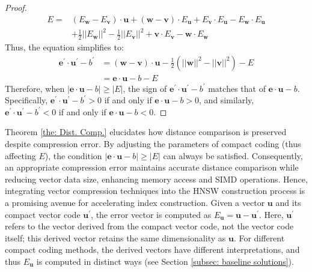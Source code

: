 \begin{proof}
\begin{equation}
\begin{aligned}
    E = &(E_{\boldsymbol{w}}-E_{\boldsymbol{v}}) \cdot \boldsymbol{u} + (\boldsymbol{w}-\boldsymbol{v})\cdot E_{\boldsymbol{u}} + E_{\boldsymbol{v}} \cdot E_{\boldsymbol{u}} - E_{\boldsymbol{w}}\cdot E_{\boldsymbol{u}}\\
    &+ \frac{1}{2}||E_{\boldsymbol{w}}||^2-\frac{1}{2}||E_{\boldsymbol{v}}||^2 +\boldsymbol{v}\cdot E_{\boldsymbol{v}}-\boldsymbol{w}\cdot E_{\boldsymbol{w}}
\end{aligned}
\end{equation}
Thus, the equation simplifies to:
\begin{equation}
\label{equ: error2}
\begin{aligned}
    \boldsymbol{e}^{\prime} \cdot \boldsymbol{u}^{\prime} - b^{\prime}
    &= (\boldsymbol{w}-\boldsymbol{v}) \cdot \boldsymbol{u} -\frac{1}{2} (||\boldsymbol{w}||^2-||\boldsymbol{v}||^2) - E \\
    &=\boldsymbol{e}\cdot \boldsymbol{u}-b - E
\end{aligned}
\end{equation}
Therefore, when $|\boldsymbol{e} \cdot \boldsymbol{u} - b|\geq |E|$, the sign of $\boldsymbol{e}^{\prime} \cdot \boldsymbol{u}^{\prime} - b^{\prime}$ matches that of $\boldsymbol{e} \cdot \boldsymbol{u}-b$. Specifically, $\boldsymbol{e}^{\prime} \cdot \boldsymbol{u}^{\prime} - b^{\prime}>0$ if and only if $\boldsymbol{e} \cdot \boldsymbol{u}-b>0$, and similarly, $\boldsymbol{e}^{\prime} \cdot \boldsymbol{u}^{\prime} - b^{\prime}<0$ if and only if $\boldsymbol{e} \cdot \boldsymbol{u}-b<0$.
\end{proof}

Theorem \ref{the: Dist. Comp.} elucidates how distance comparison is preserved despite compression error. By adjusting the parameters of compact coding (thus affecting $E$), the condition $|\boldsymbol{e} \cdot \boldsymbol{u} - b|\geq |E|$ can always be satisfied. Consequently, an appropriate compression error maintains accurate distance comparison while reducing vector data size, enhancing memory access and SIMD operations. Hence, integrating vector compression techniques into the HNSW construction process is a promising avenue for accelerating index construction.
{
Given a vector $\boldsymbol{u}$ and its compact vector code $\boldsymbol{u}^{\prime}$, the error vector is computed as $E_{\boldsymbol{u}} = \boldsymbol{u} - \boldsymbol{u}^{\prime}$. Here, $\boldsymbol{u}^{\prime}$ refers to the vector derived from the compact vector code, not the vector code itself; this derived vector retains the same dimensionality as $\boldsymbol{u}$.
For different compact coding methods, the derived vectors have different interpretations, and thus $E_{\boldsymbol{u}}$ is computed in distinct ways (see Section \ref{subsec: baseline solutions}).
}

